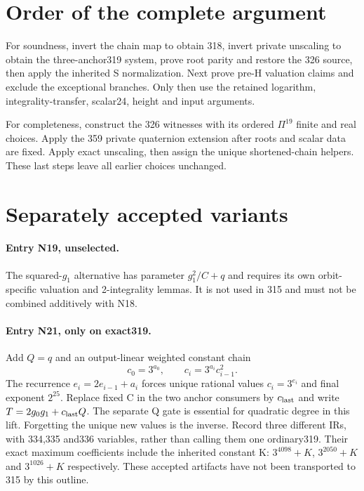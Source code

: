 \documentclass{article}
\begin{document}
\section{Order of the complete argument}
\label{outline:composition}
For soundness, invert the chain map to obtain 318, invert private
unscaling to obtain the three-anchor319 system, prove root parity and
restore the 326 source, then apply the inherited S normalization.
Next prove pre-H valuation claims and exclude the exceptional branches.
Only then use the retained logarithm, integrality-transfer, scalar24,
height and input arguments.

For completeness, construct the 326 witnesses with its ordered
$\Pi^{19}$ finite and real choices. Apply the 359 private quaternion
extension after roots and scalar data are fixed. Apply exact unscaling,
then assign the unique shortened-chain helpers. These last steps leave
all earlier choices unchanged.

\section{Separately accepted variants}
\label{outline:variants}
\paragraph{Entry N19, unselected.}
The squared-$g_1$ alternative has parameter $g_1^2/C+q$ and requires its
own orbit-specific valuation and 2-integrality lemmas. It is not used in
315 and must not be combined additively with N18.

\paragraph{Entry N21, only on exact319.}
Add $Q=q$ and an output-linear weighted constant chain
\[
 c_0=3^{a_0},\qquad c_i=3^{a_i}c_{i-1}^2.
\]
The recurrence $e_i=2e_{i-1}+a_i$ forces unique rational values
$c_i=3^{e_i}$ and final exponent $2^{25}$. Replace fixed C in the two
anchor consumers by $c_{\rm last}$ and write $T=2g_0g_1+c_{\rm last}Q$.
The separate Q gate is essential for quadratic degree in this lift.
Forgetting the unique new values is the inverse. Record three different
IRs, with 334,335 and336 variables, rather than calling them one ordinary319.
Their exact maximum coefficients include the inherited constant K:
$3^{4098}+K$, $3^{2050}+K$ and $3^{1026}+K$ respectively.
These accepted artifacts have not been transported to 315 by this outline.
\end{document}
